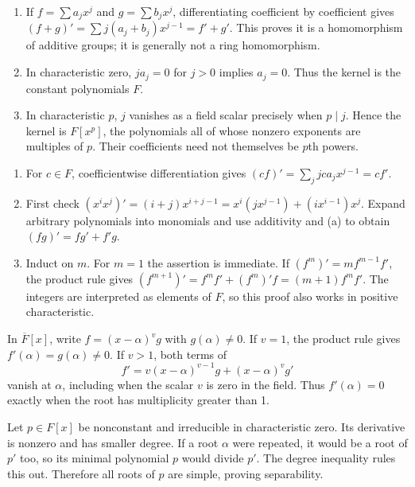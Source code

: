 \begin{enumerate}[label=(\alph*)]
\item If $f=\sum a_jx^j$ and $g=\sum b_jx^j$, differentiating coefficient by coefficient gives $(f+g)'=\sum j(a_j+b_j)x^{j-1}=f'+g'$. This proves it is a homomorphism of additive groups; it is generally not a ring homomorphism.
\item In characteristic zero, $ja_j=0$ for $j>0$ implies $a_j=0$. Thus the kernel is the constant polynomials $F$.
\item In characteristic $p$, $j$ vanishes as a field scalar precisely when $p\mid j$. Hence the kernel is $F[x^p]$, the polynomials all of whose nonzero exponents are multiples of $p$. Their coefficients need not themselves be $p$th powers.
\end{enumerate}

\begin{enumerate}[label=(\alph*)]
\item For $c\in F$, coefficientwise differentiation gives $(cf)'=\sum_jjca_jx^{j-1}=cf'$.
\item First check $(x^ix^j)'=(i+j)x^{i+j-1}=x^i(jx^{j-1})+(ix^{i-1})x^j$. Expand arbitrary polynomials into monomials and use additivity and (a) to obtain $(fg)'=fg'+f'g$.
\item Induct on $m$. For $m=1$ the assertion is immediate. If $(f^m)'=mf^{m-1}f'$, the product rule gives $(f^{m+1})'=f^mf'+(f^m)'f=(m+1)f^mf'$. The integers are interpreted as elements of $F$, so this proof also works in positive characteristic.
\end{enumerate}

In $\overline F[x]$, write $f=(x-\alpha)^vg$ with $g(\alpha)\ne0$. If $v=1$, the product rule gives $f'(\alpha)=g(\alpha)\ne0$. If $v>1$, both terms of
\[f'=v(x-\alpha)^{v-1}g+(x-\alpha)^vg'\]
vanish at $\alpha$, including when the scalar $v$ is zero in the field. Thus $f'(\alpha)=0$ exactly when the root has multiplicity greater than 1.

Let $p\in F[x]$ be nonconstant and irreducible in characteristic zero. Its derivative is nonzero and has smaller degree. If a root $\alpha$ were repeated, it would be a root of $p'$ too, so its minimal polynomial $p$ would divide $p'$. The degree inequality rules this out. Therefore all roots of $p$ are simple, proving separability.

